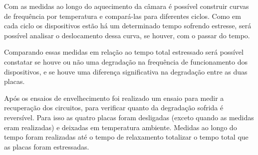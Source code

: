 Com as medidas ao longo do aquecimento da câmara é possível construir curvas de frequência por temperatura e compará-las para diferentes ciclos. Como em cada ciclo os dispositivos estão há um determinado tempo sofrendo estresse, será possível analisar o deslocamento dessa curva, se houver, com o passar do tempo.

Comparando essas medidas em relação ao tempo total estressado será possível constatar se houve ou não uma degradação na frequência de funcionamento dos dispositivos, e se houve uma diferença significativa na degradação entre as duas placas.

Após os ensaios de envelhecimento foi realizado um ensaio para medir a recuperação dos circuitos, para verificar quanto da degradação sofrida é reversível. Para isso as quatro placas foram desligadas (exceto quando as medidas eram realizadas) e deixadas em temperatura ambiente. Medidas ao longo do tempo foram realizadas até o tempo de relaxamento totalizar o tempo total que as placas foram estressadas.
